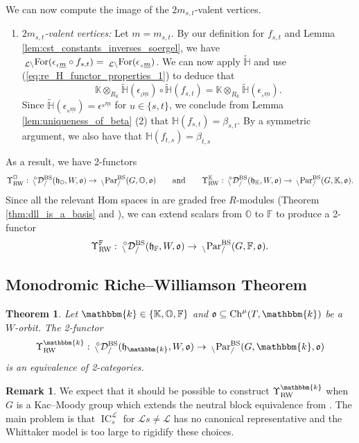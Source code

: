 \documentclass{amsart}
\newcommand{\F}{\mathbb{F}}
\renewcommand{\O}{\mathbb{O}}
\newcommand{\K}{\mathbb{K}}
\renewcommand{\k}{\mathbbm{k}}
\renewcommand{\H}{\mathbb{H}}
\newcommand{\scrL}{\mathcal{L}}
\DeclareMathOperator{\Ch}{Ch}
\DeclareMathOperator{\IC}{IC}
\newcommand{\fr}[1]{\mathfrak{#1}}
\DeclareMathOperator{\RW}{RW}
\DeclareMathOperator{\BS}{BS}
\newcommand{\PEE}[2]{\:_{#1 \backslash} \textnormal{Par}_{/ #2} }
\newcommand{\ForME}[1]{\:_{#1 \backslash} \textnormal{For}}
\newcommand{\grEWmon}[2]{\:_{#1 \backslash} \!\! {}^{\circ} \mathcal{D}_{/ #2} }
\newtheorem{theorem}[subsubsection]{Theorem}
\theoremstyle{definition}
\newtheorem{remark}[subsubsection]{Remark}
\numberwithin{equation}{subsection}
\begin{document}
We can now compute the image of the $2m_{s,t}$-valent vertices.
\begin{enumerate}
  \item[5.] \emph{$2m_{s,t}$-valent vertices: } Let $m = m_{s,t}$.
  By our definition for $f_{s,t}$ and Lemma \ref{lem:cst_constants_inverses_soergel}, we have $\ForME{\scrL} (\epsilon_{{}_t \underline{m}} \circ f_{s,t}) = \ForME{\scrL} (\epsilon_{{}_s \underline{m}})$.
  We can now apply $\tilde{\H}$ and use (\ref{eq:re_H_functor_properties_1}) to deduce that 
  \[\K \otimes_{R_{\K}} \tilde{\H} (\epsilon_{{}_t \underline{m}}) \circ \tilde{\H} (f_{s,t}) = \K \otimes_{R_{\K}} \tilde{\H} (\epsilon_{{}_s \underline{m}}).\]
  Since $\tilde{\H} (\epsilon_{{}_u \underline{m}}) = \epsilon^{{}_u \underline{m}}$ for $u \in \{s,t\}$, we conclude from Lemma \ref{lem:uniqueness_of_beta} (2) that $\H (f_{s,t}) = \beta_{s,t}$.
  By a symmetric argument, we also have that $\H (f_{t,s}) = \beta_{t,s}$
\end{enumerate}

As a result, we have 2-functors
\[\Upsilon_{\RW}^{\O} : \grEWmon{}{}^{\BS} (\fr{h}_{\O}, W, \fr{o}) \to \PEE{}{}^{\BS} (G, \O, \fr{o}) \qquad\text{and}\qquad \Upsilon_{\RW}^{\K} : \grEWmon{}{}^{\BS} (\fr{h}_{\K}, W, \fr{o}) \to \PEE{}{}^{\BS} (G, \K, \fr{o}).\]
Since all the relevant Hom spaces in are graded free $R$-modules (Theorem \ref{thm:dll_is_a_basis} and \cite[Lemma 3.6.3]{Sandvik}), we can extend scalars from $\O$ to $\F$ to produce a 2-functor
\[\Upsilon_{\RW}^{\F} : \grEWmon{}{}^{\BS} (\fr{h}_{\F}, W, \fr{o}) \to \PEE{}{}^{\BS} (G, \F, \fr{o}).\]

\subsection{Monodromic Riche--Williamson Theorem} 

\begin{theorem}\label{thm:mon_RW_thm}
    Let $\k \in \{\K, \O, \F\}$ and $\fr{o} \subseteq \Ch^{\mu} (T, \k)$ be a $W$-orbit. The 2-functor
    \[\Upsilon_{\RW}^{\k} : \grEWmon{}{}^{\BS} (\fr{h}_{\k}, W, \fr{o}) \to \PEE{}{}^{\BS} (G, \k, \fr{o})\]
    is an equivalence of 2-categories.
\end{theorem}

\begin{remark}
    We expect that it should be possible to construct $\Upsilon_{\textnormal{RW}}^{\k}$ when $G$ is a Kac--Moody group which extends the neutral block equivalence from \cite[Theorem 5.3.1]{Sandvik}.
    The main problem is that $\IC_s^{\scrL}$ for $\scrL s \neq \scrL$ has no canonical representative and the Whittaker model is too large to rigidify these choices.
\end{remark}
\end{document}
